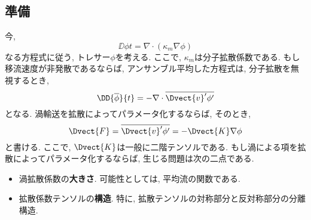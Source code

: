 \subsection{準備}
今, 
\begin{equation}
  \DD{\phi}{t} = \nabla \cdot (\kappa_m \nabla \phi)
\end{equation}
なる方程式に従う, トレサー$\phi$を考える. 
ここで, $\kappa_m$は分子拡散係数である. 
もし移流速度が非発散であるならば, アンサンブル平均した方程式は, 
分子拡散を無視するとき, 
\begin{equation}
  \DD{\overline{\phi}}{t} = - \nabla \cdot \overline{\Dvect{v}' \phi'}
\end{equation}
となる. 
渦輸送を拡散によってパラメータ化するならば, そのとき, 
\begin{equation}
  \Dvect{F} = \overline{\Dvect{v}' \phi'}
            = - \Dvect{K} \nabla \phi
\end{equation}
と書ける. 
ここで, $\Dvect{K}$は一般に二階テンソルである. 
もし渦による項を拡散によってパラメータ化するならば, 
生じる問題は次の二点である. 
\begin{itemize}
 \item 渦拡散係数の\textbf{大きさ}. 可能性としては, 平均流の関数である. 
 \item 拡散係数テンソルの\textbf{構造}. 特に, 拡散テンソルの対称部分と反対称部分の分離構造. 
\end{itemize}


